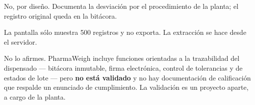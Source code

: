 No, por diseño. Documenta la desviación por el procedimiento de la planta; el registro
original queda en la bitácora.

La pantalla sólo muestra 500 registros y no exporta. La extracción se hace desde el
servidor.

No lo afirmes. PharmaWeigh incluye funciones orientadas a la trazabilidad del
dispensado --- bitácora inmutable, firma electrónica, control de tolerancias y de
estados de lote --- pero \textbf{no está validado} y no hay documentación de
calificación que respalde un enunciado de cumplimiento. La validación es un proyecto
aparte, a cargo de la planta.
